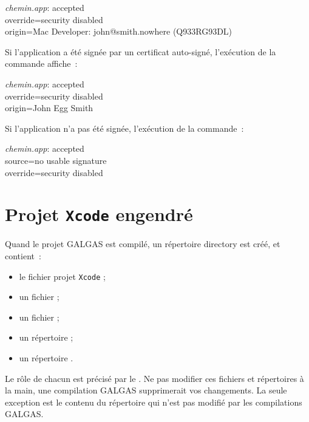 \begin{SHELL}
\emph{chemin.app}: accepted\\
override=security disabled\\
origin=Mac Developer: john@smith.nowhere (Q933RG93DL)
\end{SHELL}


Si l'application a été signée par un certificat auto-signé, l'exécution de la commande affiche~:

\begin{SHELL}
\emph{chemin.app}: accepted\\
override=security disabled\\
origin=John Egg Smith
\end{SHELL}


Si l'application n'a pas été signée, l'exécution de la commande~:
\begin{SHELL}
\emph{chemin.app}: accepted\\
source=no usable signature\\
override=security disabled
\end{SHELL}









\section{Projet \texttt{Xcode} engendré}


Quand le projet GALGAS est compilé, un répertoire  directory est créé, et contient~:
\begin{itemize}
\item le fichier projet \texttt{Xcode} ;
\item un fichier  ;
\item un fichier  ;
\item un répertoire  ;
\item un répertoire .
\end{itemize}

Le rôle de chacun est précisé par le . Ne pas modifier ces fichiers et répertoires à la main, une compilation GALGAS supprimerait vos changements. La seule exception est le contenu du répertoire  qui n'est pas modifié par les compilations GALGAS.


